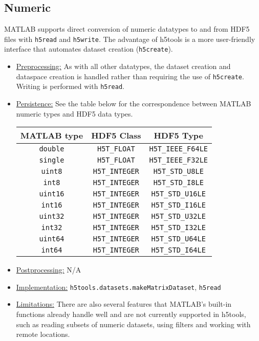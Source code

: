 \documentclass[11pt]{exam}
\newcommand\myfcn[1]{\colorbox{codegray}{\textcolor{codeblue}{\texttt{#1}}}}
\newcommand\matfcn[1]{\textcolor{darkteal}{\texttt{#1}}}
\begin{document}
        \subsection{Numeric}
        \noindent MATLAB supports direct conversion of numeric datatypes to and from HDF5 files with \matfcn{h5read} and \matfcn{h5write}. The advantage of h5tools is a more user-friendly interface that automates dataset creation (\matfcn{h5create}).
        \begin{itemize}
	        \item \underline{Preprocessing:} As with all other datatypes, the dataset creation and dataspace creation is handled rather than requiring the use of \matfcn{h5create}. Writing is performed with \matfcn{h5read}.
	        \item \underline{Persistence:} See the table below for the correspondence between MATLAB numeric types and HDF5 data types.\\
	        \begin{center}\begin{tabular}{| c | c | c |}
                \hline
                \textbf{MATLAB type} & \textbf{HDF5 Class} & \textbf{HDF5 Type}\\
                \hline
                \texttt{double} & \texttt{H5T\_FLOAT} & \texttt{H5T\_IEEE\_F64LE}\\
                \texttt{single} & \texttt{H5T\_FLOAT} & \texttt{H5T\_IEEE\_F32LE}\\
                \texttt{uint8} & \texttt{H5T\_INTEGER} & \texttt{H5T\_STD\_U8LE}\\
                \texttt{int8} & \texttt{H5T\_INTEGER} & \texttt{H5T\_STD\_I8LE}\\
                \texttt{uint16} & \texttt{H5T\_INTEGER} & \texttt{H5T\_STD\_U16LE}\\
                \texttt{int16} & \texttt{H5T\_INTEGER} & \texttt{H5T\_STD\_I16LE}\\
                \texttt{uint32} & \texttt{H5T\_INTEGER} & \texttt{H5T\_STD\_U32LE}\\
                \texttt{int32} & \texttt{H5T\_INTEGER} & \texttt{H5T\_STD\_I32LE}\\
                \texttt{uint64} & \texttt{H5T\_INTEGER} & \texttt{H5T\_STD\_U64LE}\\
                \texttt{int64} & \texttt{H5T\_INTEGER} & \texttt{H5T\_STD\_I64LE}\\
                \hline
            \end{tabular}\end{center}
	        \item \underline{Postprocessing:} N/A
			\item \underline{Implementation:} \myfcn{h5tools.datasets.makeMatrixDataset}, \matfcn{h5read}
			\item \underline{Limitations:} There are also several features that MATLAB's built-in functions already handle well and are not currently supported in h5tools, such as reading subsets of numeric datasets, using filters and working with remote locations. 
	    \end{itemize}
		
\end{document}
